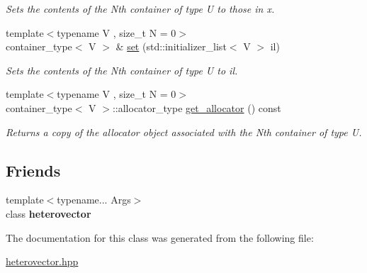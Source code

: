\begin{DoxyCompactItemize}
\begin{DoxyCompactList}\small\item\em Sets the contents of the Nth container of type U to those in x. \end{DoxyCompactList}\item 
\hypertarget{classheterogeneous_1_1heterovector_3_01_t_00_01_u_00_01_types_8_8_8_4_ae72e5a0790b0751cbe01f9c47121fe64}{}{\footnotesize template$<$typename V , size\+\_\+t N = 0$>$ }\\container\+\_\+type$<$ V $>$ \& \hyperlink{classheterogeneous_1_1heterovector_3_01_t_00_01_u_00_01_types_8_8_8_4_ae72e5a0790b0751cbe01f9c47121fe64}{set} (std\+::initializer\+\_\+list$<$ V $>$ il)\label{classheterogeneous_1_1heterovector_3_01_t_00_01_u_00_01_types_8_8_8_4_ae72e5a0790b0751cbe01f9c47121fe64}

\begin{DoxyCompactList}\small\item\em Sets the contents of the Nth container of type U to il. \end{DoxyCompactList}\item 
\hypertarget{classheterogeneous_1_1heterovector_3_01_t_00_01_u_00_01_types_8_8_8_4_a26c9cf59f29638b77813b16ce0132aa8}{}{\footnotesize template$<$typename V , size\+\_\+t N = 0$>$ }\\container\+\_\+type$<$ V $>$\+::allocator\+\_\+type \hyperlink{classheterogeneous_1_1heterovector_3_01_t_00_01_u_00_01_types_8_8_8_4_a26c9cf59f29638b77813b16ce0132aa8}{get\+\_\+allocator} () const \label{classheterogeneous_1_1heterovector_3_01_t_00_01_u_00_01_types_8_8_8_4_a26c9cf59f29638b77813b16ce0132aa8}

\begin{DoxyCompactList}\small\item\em Returns a copy of the allocator object associated with the Nth container of type U. \end{DoxyCompactList}\end{DoxyCompactItemize}
\subsection*{Friends}
\begin{DoxyCompactItemize}
\item 
\hypertarget{classheterogeneous_1_1heterovector_3_01_t_00_01_u_00_01_types_8_8_8_4_acd0092b47333ef1d1254476c1c3390c4}{}{\footnotesize template$<$typename... Args$>$ }\\class {\bfseries heterovector}\label{classheterogeneous_1_1heterovector_3_01_t_00_01_u_00_01_types_8_8_8_4_acd0092b47333ef1d1254476c1c3390c4}

\end{DoxyCompactItemize}


The documentation for this class was generated from the following file\+:\begin{DoxyCompactItemize}
\item 
\hyperlink{heterovector_8hpp}{heterovector.\+hpp}\end{DoxyCompactItemize}
